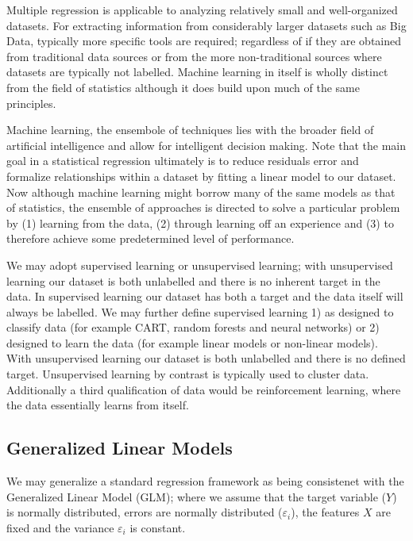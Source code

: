 \documentclass[7pt]{article}
\begin{document}
Multiple regression is applicable to analyzing relatively small and well-organized datasets. For extracting information from considerably larger datasets such as Big Data, typically more specific tools are required; regardless of if they are obtained from traditional data sources or from the more non-traditional sources where datasets are typically not labelled. Machine learning in itself is wholly distinct from the field of statistics although it does build upon much of the same principles. 

Machine learning, the ensembole of techniques lies with the broader field of artificial intelligence and allow for intelligent decision making. Note that the main goal in a statistical regression ultimately is to reduce  residuals error and formalize relationships within a dataset by fitting a linear model to our dataset. Now although machine learning might borrow many of the same models as that of statistics, the ensemble of approaches is directed to solve a particular problem by (1) learning from the data, (2) through learning off an experience and (3) to therefore achieve some predetermined level of performance.

We may adopt supervised learning or unsupervised learning; with unsupervised learning our dataset is both unlabelled and there is no inherent target in the data. In supervised learning our dataset has both a target and the data itself will always be labelled. We may further define supervised learning 1) as designed to classify data (for example CART, random forests and neural networks) or 2) designed to learn the data (for example linear models or non-linear models).  With unsupervised learning our dataset is both unlabelled and there is no defined target. Unsupervised learning by contrast is typically used to cluster data. Additionally a third qualification of data would be reinforcement learning, where the data essentially learns from itself.

\subsection{Generalized Linear Models}

We may generalize a standard regression framework as being consistenet with the Generalized Linear Model (GLM); where we assume that the target variable ($Y$) is normally distributed, errors are normally distributed ($\varepsilon_i$), the features $X$ are fixed and the variance $\varepsilon_i$ is constant. 
 
\end{document}
